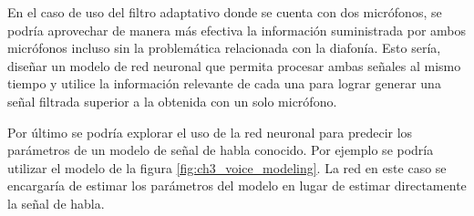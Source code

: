 En el caso de uso del filtro adaptativo donde se cuenta con dos micrófonos, se podría aprovechar de manera más efectiva la información suministrada por ambos micrófonos incluso sin la problemática relacionada con la diafonía. Esto sería, diseñar un modelo de red neuronal que permita procesar ambas señales al mismo tiempo y utilice la información relevante de cada una para lograr generar una señal filtrada superior a la obtenida con un solo micrófono.

Por último se podría explorar el uso de la red neuronal para predecir los parámetros de un modelo de señal de habla conocido. Por ejemplo se podría utilizar el modelo de la figura \ref{fig:ch3_voice_modeling}. La red en este caso se encargaría de estimar los parámetros del modelo en lugar de estimar directamente la señal de habla.